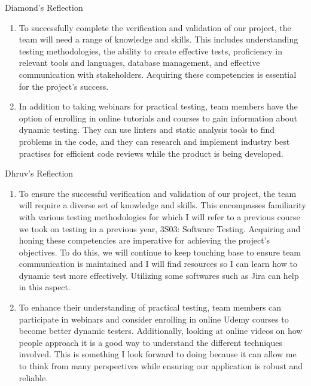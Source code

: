 \documentclass[12pt, titlepage]{article}
\begin{document}
Diamond's Reflection
\begin{enumerate}
    \item To successfully complete the verification and validation of our project, the team will need a range of knowledge and skills. This includes understanding testing methodologies, the ability to create effective tests, proficiency in relevant tools and languages, database management, and effective communication with stakeholders. Acquiring these competencies is essential for the project's success.
    \item In addition to taking webinars for practical testing, team members have the option of enrolling in online tutorials and courses to gain information about dynamic testing. They can use linters and static analysis tools to find problems in the code, and they can research and implement industry best practises for efficient code reviews while the product is being developed.
\end{enumerate}

Dhruv's Reflection
\begin{enumerate}
    \item To ensure the successful verification and validation of our project, the team will require a diverse set of knowledge and skills. This encompasses familiarity with various testing methodologies for which I will refer to a previous course we took on testing in a previous year, 3S03: Software Testing. Acquiring and honing these competencies are imperative for achieving the project's objectives. To do this, we will continue to keep touching base to ensure team communication is maintained and I will find resources so I can learn how to dynamic test more effectively. Utilizing some softwares such as Jira can help in this aspect. 
    \item To enhance their understanding of practical testing, team members can participate in webinars and consider enrolling in online Udemy courses to become better dynamic testers. Additionally, looking at online videos on how people approach it is a good way to understand the different techniques involved. This is something I look forward to doing because it can allow me to think from many perspectives while ensuring our application is robust and reliable. 

\end{enumerate}
\end{document}
